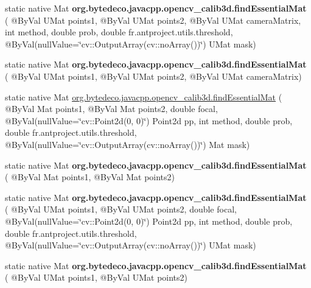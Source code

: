 \begin{DoxyCompactItemize}
\item 
\mbox{\label{group__calib3d_ga4849fceb2741d87f1cd8ebafce6a2be6}} 
static native Mat {\bfseries org.\+bytedeco.\+javacpp.\+opencv\+\_\+calib3d.\+find\+Essential\+Mat} ( @By\+Val U\+Mat points1, @By\+Val U\+Mat points2, @By\+Val U\+Mat camera\+Matrix, int method, double prob, double fr.antproject.utils.threshold, @By\+Val(null\+Value=\char`\"{}cv\+::\+Output\+Array(cv\+::no\+Array())\char`\"{}) U\+Mat mask)
\item 
\mbox{\label{group__calib3d_gae83045fa60b7e1fa99f4e9e5313703c4}} 
static native Mat {\bfseries org.\+bytedeco.\+javacpp.\+opencv\+\_\+calib3d.\+find\+Essential\+Mat} ( @By\+Val U\+Mat points1, @By\+Val U\+Mat points2, @By\+Val U\+Mat camera\+Matrix)
\item 
static native Mat \hyperlink{group__calib3d_gad36d1e3d84d08813292f71bad120f252}{org.\+bytedeco.\+javacpp.\+opencv\+\_\+calib3d.\+find\+Essential\+Mat} ( @By\+Val Mat points1, @By\+Val Mat points2, double focal, @By\+Val(null\+Value=\char`\"{}cv\+::\+Point2d(0, 0)\char`\"{}) Point2d pp, int method, double prob, double fr.antproject.utils.threshold, @By\+Val(null\+Value=\char`\"{}cv\+::\+Output\+Array(cv\+::no\+Array())\char`\"{}) Mat mask)
\item 
\mbox{\label{group__calib3d_ga957da7f376f227b7cdd2f1a72365cbe1}} 
static native Mat {\bfseries org.\+bytedeco.\+javacpp.\+opencv\+\_\+calib3d.\+find\+Essential\+Mat} ( @By\+Val Mat points1, @By\+Val Mat points2)
\item 
\mbox{\label{group__calib3d_gae778255c4831f4e77bb8152d563da762}} 
static native Mat {\bfseries org.\+bytedeco.\+javacpp.\+opencv\+\_\+calib3d.\+find\+Essential\+Mat} ( @By\+Val U\+Mat points1, @By\+Val U\+Mat points2, double focal, @By\+Val(null\+Value=\char`\"{}cv\+::\+Point2d(0, 0)\char`\"{}) Point2d pp, int method, double prob, double fr.antproject.utils.threshold, @By\+Val(null\+Value=\char`\"{}cv\+::\+Output\+Array(cv\+::no\+Array())\char`\"{}) U\+Mat mask)
\item 
\mbox{\label{group__calib3d_gaad2bff5e4a0609446db73eab300a93a0}} 
static native Mat {\bfseries org.\+bytedeco.\+javacpp.\+opencv\+\_\+calib3d.\+find\+Essential\+Mat} ( @By\+Val U\+Mat points1, @By\+Val U\+Mat points2)
\item 

\end{DoxyCompactItemize}
